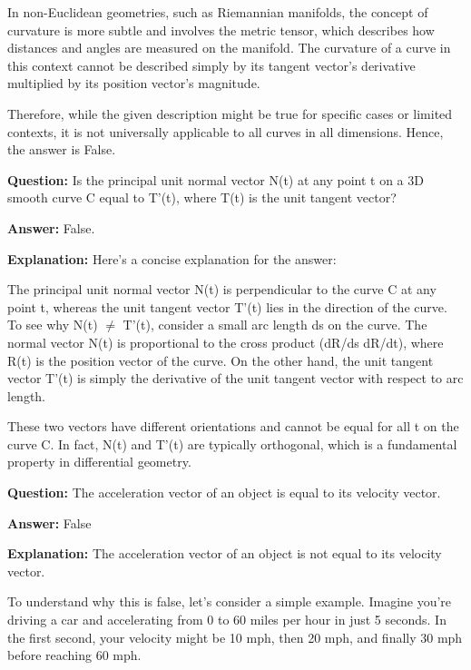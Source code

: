 \documentclass{article}
\begin{document}
In non-Euclidean geometries, such as Riemannian manifolds, the concept of curvature is more subtle and involves the metric tensor, which describes how distances and angles are measured on the manifold. The curvature of a curve in this context cannot be described simply by its tangent vector's derivative multiplied by its position vector's magnitude.

Therefore, while the given description might be true for specific cases or limited contexts, it is not universally applicable to all curves in all dimensions. Hence, the answer is False.
                
                \vspace{0.5cm} 
        
            
                \textbf {Question:} Is the principal unit normal vector N(t) at any point t on a 3D smooth curve C equal to T'(t), where T(t) is the unit tangent vector?
                
                \textbf{Answer:} False.

                \textbf{Explanation:} Here's a concise explanation for the answer:

The principal unit normal vector N(t) is perpendicular to the curve C at any point t, whereas the unit tangent vector T'(t) lies in the direction of the curve. To see why N(t) \ensuremath{\neq} T'(t), consider a small arc length ds on the curve. The normal vector N(t) is proportional to the cross product (dR/ds {\texttimes} dR/dt), where R(t) is the position vector of the curve. On the other hand, the unit tangent vector T'(t) is simply the derivative of the unit tangent vector with respect to arc length.

These two vectors have different orientations and cannot be equal for all t on the curve C. In fact, N(t) and T'(t) are typically orthogonal, which is a fundamental property in differential geometry.
                
                \vspace{0.5cm} 
        
            
                \textbf {Question:} The acceleration vector of an object is equal to its velocity vector.
                
                \textbf{Answer:} False

                \textbf{Explanation:} The acceleration vector of an object is not equal to its velocity vector.

To understand why this is false, let's consider a simple example. Imagine you're driving a car and accelerating from 0 to 60 miles per hour in just 5 seconds. In the first second, your velocity might be 10 mph, then 20 mph, and finally 30 mph before reaching 60 mph.
\end{document}
